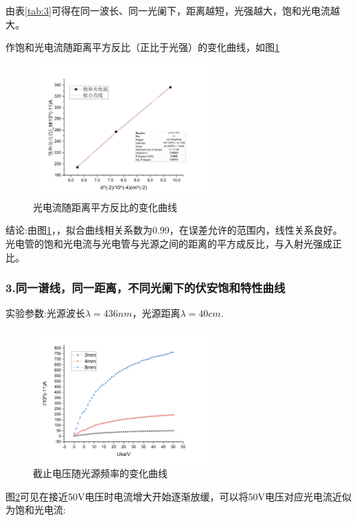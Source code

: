 \documentclass[12pt,a4paper,UTF8]{ctexart}
\begin{document}
由表\ref{tab:3}可得在同一波长、同一光阑下，距离越短，光强越大，饱和光电流越大。


作饱和光电流随距离平方反比（正比于光强）的变化曲线，如图\ref{fig:4}
\begin{figure}[!h]
	\centering
	\includegraphics[width=0.6\textwidth]{img//reg3.png}
	\caption{光电流随距离平方反比的变化曲线}
	\label{fig:4}
\end{figure}
结论:由图\ref{fig:4}，，拟合曲线相关系数为0.99，在误差允许的范围内，线性关系良好。
光电管的饱和光电流与光电管与光源之间的距离的平方成反比，与入射光强成正比。

\subsubsection*{3.同一谱线，同一距离，不同光阑下的伏安饱和特性曲线}
实验参数:光源波长$\lambda=436nm$，光源距离$\lambda=40cm$.

\begin{figure}[!h]
	\centering
	\includegraphics[width=0.6\textwidth]{img//phi.png}
	\caption{截止电压随光源频率的变化曲线}
	\label{fig:phi}
\end{figure}
图\ref{fig:phi}可见在接近50V电压时电流增大开始逐渐放缓，可以将50V电压对应光电流近似为饱和光电流:

\begin{table}[htbp]
	\centering
	\caption{不同直径光阑饱和电流值}
	\vspace{0.7em}
\label{tab:4}%
\end{table}
\end{document}
